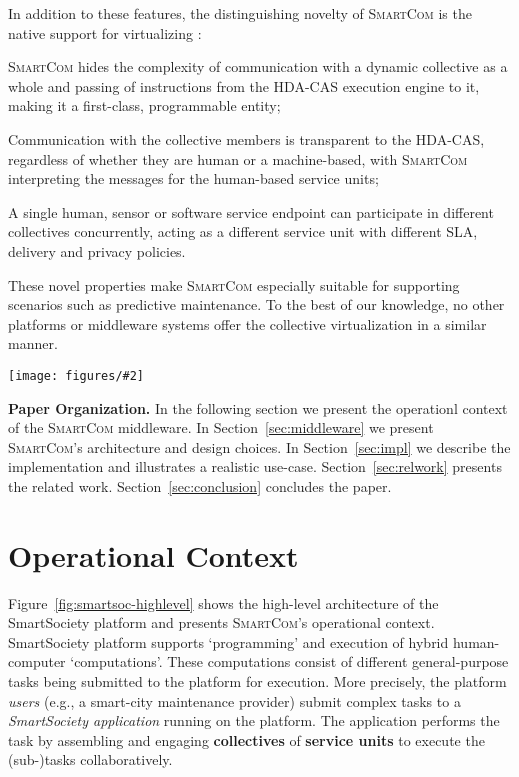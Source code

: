 \documentclass{llncs}
\newcommand{\mdl}{\textsc{SmartCom}}
\newcommand{\figtop}[3][0.9]{
\begin{figure*}[h]
\centering
\texttt{[image: figures/\#2]}
\caption{#3}
\label{fig:#2}
\end{figure*}
}
\begin{document}
	In addition to these features, the distinguishing novelty of \mdl{} is the native support for virtualizing : 
	\begin{inparaenum}[i) \itshape]
	\item
	\mdl{} hides the complexity of communication with a dynamic collective as a whole and passing of instructions from the HDA-CAS execution engine to it, making it a first-class, programmable entity; 
	\item 
	Communication with the collective members is transparent to the HDA-CAS, regardless of whether they are human or a machine-based, with \mdl{} interpreting the messages for the human-based service units; 
	\item 
	A single human, sensor or software service endpoint can participate in different collectives concurrently, acting as a different service unit with different SLA, delivery and privacy policies. 
	\end{inparaenum}
	These novel properties make \mdl{} especially suitable for supporting scenarios such as predictive maintenance. To the best of our knowledge, no other platforms or middleware systems offer the collective virtualization in a similar manner. 


\figtop[.85]{smartsoc-highlevel}{Operational context for the \mdl{} middleware. Middleware components are marked in blue.}


\textbf{Paper Organization. }
  In the following section we present the operationl context of the \mdl{} middleware. In Section~\ref{sec:middleware} we present \mdl's architecture and design choices. In Section~\ref{sec:impl} we  describe the implementation and illustrates a realistic use-case. Section~\ref{sec:relwork} presents the related work. Section~\ref{sec:conclusion} concludes the paper.


  \section{Operational Context}
    \label{sec:intro:context}

      Figure~\ref{fig:smartsoc-highlevel} shows the high-level architecture of the SmartSociety platform and presents \mdl's operational context. SmartSociety platform supports `programming' and execution of hybrid human-computer `computations'. These computations consist of different general-purpose tasks being submitted to the platform for execution. More precisely, the platform \emph{users} (e.g., a smart-city maintenance provider) submit complex tasks to a \emph{SmartSociety application} running on the platform. The application performs the task by assembling and engaging \textbf{collectives} of \textbf{service units} to execute the (sub-)tasks collaboratively.
\end{document}
